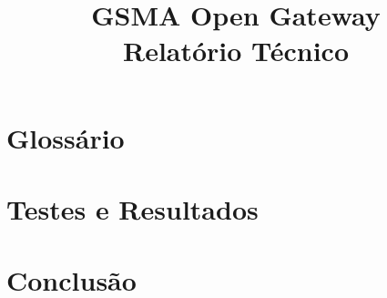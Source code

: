\documentclass[code,math,bibliography]{relatorio-deti}
\title{GSMA Open Gateway\\[20pt]Relatório Técnico}
\begin{document}
\maketitle

%
%



\tableofcontents

\chapter*{Glossário}
\thispagestyle{empty}



\clearpage







\chapter{Testes e Resultados}

\chapter{Conclusão}

\printbibliography[heading=bibintoc]
\end{document}
